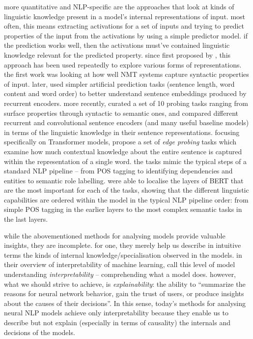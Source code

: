 \documentclass[bsc,frontabs,twoside,singlespacing,parskip,deptreport]{infthesis}
\begin{document}
{{    more quantitative and NLP-specific are the approaches that look at kinds of linguistic knowledge present in a model's internal representations of input. most often, this means extracting activations for a set of inputs and trying to predict properties of the input from the activations by using a simple predictor model. if the prediction works well, then the activations must've contained linguistic knowledge relevant for the predicted property. since first proposed by \citet{Shi_2016}, this approach has been used repeatedly to explore various forms of representations. the first work was looking at how well NMT systems capture syntactic properties of input. later, \citet{Adi_2017} used simpler artificial prediction tasks (sentence length, word content and word order) to better understand sentence embeddings produced by recurrent encoders. more recently, \citet{Conneau_2018} curated a set of 10 probing tasks ranging from surface properties through syntactic to semantic ones, and compared different recurrent and convolutional sentence encoders (and many useful baseline models) in terms of the linguistic knowledge in their sentence representations.
    focusing specifically on Transformer models, \citet{Tenney_2019a} propose a set of \textit{edge probing} tasks which examine how much contextual knowledge about the entire sentence is captured within the representation of a single word. the tasks mimic the typical steps of a standard NLP pipeline -- from POS tagging to identifying dependencies and entities to semantic role labelling. \citet{Tenney_2019b} were able to localise the layers of BERT that are the most important for each of the tasks, showing that the different linguistic capabilities are ordered within the model in the typical NLP pipeline order: from simple POS tagging in the earlier layers to the most complex semantic tasks in the last layers.

    while the abovementioned methods for analysing models provide valuable insights, they are incomplete. for one, they merely help us describe in intuitive terms the kinds of internal knowledge/specialisation observed in the models. in their overview of interpretability of machine learning, \citet{Gilpin_2018} call this level of model understanding \textit{interpretability} -- comprehending what a model does. however, what we should strive to achieve, is \textit{explainability}: the ability to ``summarize the reasons for neural network behavior, gain the trust of users, or produce insights about the causes of their decisions''. In this sense, today's methods for analysing neural NLP models achieve only interpretability because they enable us to describe but not explain (especially in terms of causality) the internals and decisions of the models.
    
}}
\end{document}
